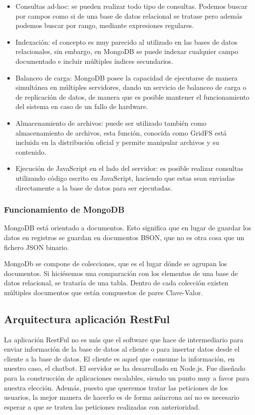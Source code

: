 \begin{itemize}
    \item Consultas ad-hoc: se pueden realizar todo tipo de consultas. Podemos buscar por campos como si de una base de datos relacional se tratase pero además podemos buscar por rango, mediante expresiones regulares.
    \item Indexación: el concepto es muy parecido al utilizado en las bases de datos relacionales, sin embargo, en MongoDB se puede indexar cualquier campo documentado e incluir múltiples índices secundarios.
    \item Balanceo de carga: MongoDB posee la capacidad de ejecutarse de manera simultánea en múltiples servidores, dando un servicio de balanceo de carga o de replicación de datos, de manera que es posible mantener el funcionamiento del sistema en caso de un fallo de hardware.
    \item Almacenamiento de archivos: puede ser utilizado también como almacenamiento de archivos, esta función, conocida como GridFS está incluida en la distribución oficial y permite manipular archivos y su contenido.
    \item Ejecución de JavaScript en el lado del servidor: es posible realizar consultas utilizando código escrito en JavaScript, haciendo que estas sean enviadas directamente a la base de datos para ser ejecutadas.
\end{itemize}

\subsubsection{Funcionamiento de MongoDB}
MongoDB está orientado a documentos. Esto significa que en lugar de guardar los datos en registros se guardan en documentos BSON, que no es otra cosa que un fichero JSON binario.

MongoDb se compone de colecciones, que es el lugar dónde se agrupan los documentos. Si hiciésemos una comparación con los elementos de una base de datos relacional, se trataría de una tabla. Dentro de cada colección existen múltiples documentos que están compuestos de pares Clave-Valor.

\subsection{Arquitectura aplicación RestFul}

La aplicación RestFul no es más que el software que hace de intermediario para enviar información de la base de datos al cliente o para insertar datos desde el cliente a la base de datos. El cliente es aquel que consume la información, en nuestro caso, el chatbot. El servidor se ha desarrollado en Node.js. Fue diseñado para la construcción de aplicaciones escalables, siendo un punto muy a favor para nuestra elección. Además, puesto que queremos tratar las peticiones de los usuarios, la mejor manera de hacerlo es de forma asíncrona así no es necesario esperar a que se traten las peticiones realizadas con anterioridad.


